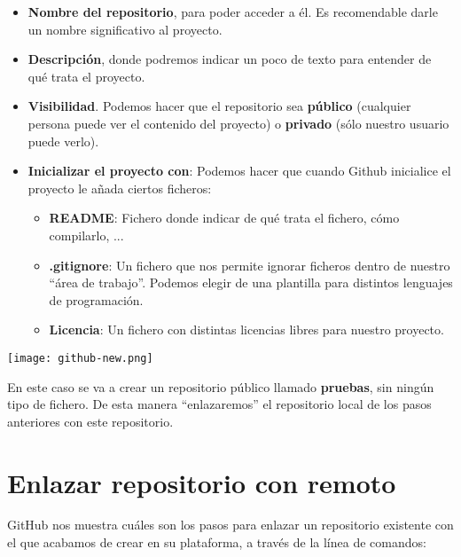 \begin{itemize}
    \item \textbf{Nombre del repositorio}, para poder acceder a él. Es recomendable darle un nombre significativo al proyecto.
    \item \textbf{Descripción}, donde podremos indicar un poco de texto para entender de qué trata el proyecto.
    \item \textbf{Visibilidad}. Podemos hacer que el repositorio sea \textbf{público} (cualquier persona puede ver el contenido del proyecto) o \textbf{privado} (sólo nuestro usuario puede verlo).

    \item \textbf{Inicializar el proyecto con}: Podemos hacer que cuando Github inicialice el proyecto le añada ciertos ficheros:
    \begin{itemize}
        \item \textbf{README}: Fichero donde indicar de qué trata el fichero, cómo compilarlo, ...
        \item \textbf{.gitignore}: Un fichero que nos permite ignorar ficheros dentro de nuestro “área de trabajo”. Podemos elegir de una plantilla para distintos lenguajes de programación.
        \item \textbf{Licencia}: Un fichero con distintas licencias libres para nuestro proyecto.
    \end{itemize}
\end{itemize}


\begin{center}
    \texttt{[image: github-new.png]}
\end{center}

En este caso se va a crear un repositorio público llamado \textbf{pruebas}, sin ningún tipo de fichero. De esta manera “enlazaremos” el repositorio local de los pasos anteriores con este repositorio.


\chapter{Enlazar repositorio con remoto}

GitHub nos muestra cuáles son los pasos para enlazar un repositorio existente con el que acabamos de crear en su plataforma, a través de la línea de comandos:



